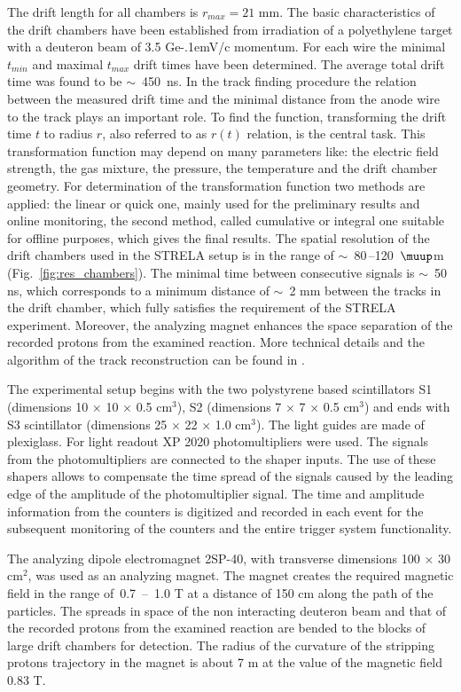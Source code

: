 \documentclass[twocolumn,epjc3]{svjour3}
\newcommand{\GeVc}   {Ge\kern-.1emV/c\xspace}
\begin{document}
The drift length for all chambers is $r_{max} = 21$ mm. The basic
characteristics of the drift chambers have been established from irradiation of
a polyethylene target with a deuteron beam of 3.5 \GeVc momentum. For each wire
the minimal $t_{min}$ and maximal $t_{max}$ drift times have been
determined. The average total drift time was found to be $\sim$~450~ns. In the
track finding procedure the relation between the measured drift time and the
minimal distance from the anode wire to the track plays an important role. To
find the function, transforming the drift time $t$ to radius $r$, also referred
to as $r(t)$ relation, is the central task. This transformation function may
depend on many parameters like: the electric field strength, the gas mixture,
the pressure, the temperature and the drift chamber geometry. For determination
of the transformation function two methods are applied: the linear or quick one,
mainly used for the preliminary results and online monitoring, the second
method, called cumulative or integral one suitable for offline purposes, which
gives the final results. The spatial resolution of the drift chambers used in
the STRELA setup is in the range of $\sim$~80\,--120~$\muup$m
(Fig.~\ref{fig:res_chambers}). The minimal time between consecutive signals is
$\sim$~50 ns, which corresponds to a minimum distance of $\sim$~2 mm between the
tracks in the drift chamber, which fully satisfies the requirement of the STRELA
experiment. Moreover, the analyzing magnet enhances the space separation of the
recorded protons from the examined reaction. More technical details and the
algorithm of the track reconstruction can be found in \cite{gla13}.

The experimental setup begins with the two polystyrene based scintillators S1
(dimensions 10 $\times$ 10 $\times$ 0.5 cm$^3$), S2 (dimensions 7 $\times$ 7
$\times$ 0.5 cm$^3$) and ends with S3 scintillator (dimensions 25 $\times$ 22
$\times$ 1.0 cm$^3$). The light guides are made of plexiglass. For light readout
XP 2020 photomultipliers were used. The signals from the photomultipliers are
connected to the shaper inputs. The use of these shapers allows to compensate
the time spread of the signals caused by the leading edge of the amplitude of
the photomultiplier signal. The time and amplitude information from the counters
is digitized and recorded in each event for the subsequent monitoring of the
counters and the entire trigger system functionality.

The analyzing dipole electromagnet 2SP-40, with transverse dimensions 100
$\times$ 30 cm$^2$, was used as an analyzing magnet. The magnet creates the
required magnetic field in the range of \,0.7~--~1.0 T at a distance of 150 cm
along the path of the particles. The spreads in space of the non interacting
deuteron beam and that of the recorded protons from the examined reaction are
bended to the blocks of large drift chambers for detection. The radius of the
curvature of the stripping protons trajectory in the magnet is about 7 m at the
value of the magnetic field 0.83 T.
\end{document}
